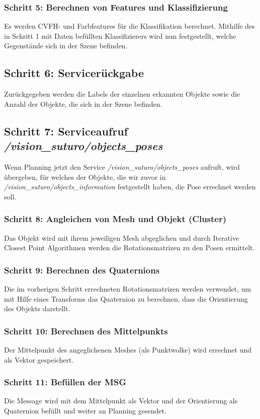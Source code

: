 \documentclass{suturo}
\begin{document}
\subsubsection{Schritt 5: Berechnen von Features und Klassifizierung}
Es werden CVFH- und Farbfeatures für die Klassifikation berechnet. Mithilfe des in Schritt 1 mit Daten befüllten Klassifizierers wird nun festgestellt, welche Gegenstände sich in der Szene befinden.
\\
\subsection{Schritt 6: Servicerückgabe}
Zurückgegeben werden die Labels der einzelnen erkannten Objekte sowie die Anzahl der Objekte, die sich in der Szene befinden.
\\
\subsection{Schritt 7: Serviceaufruf \textit{/vision\_suturo/objects\_poses}}
Wenn Planning jetzt den Service \textit{/vision\_suturo/objects\_poses} aufruft, wird übergeben, für welches der Objekte, die wir zuvor in \textit{/vision\_suturo/objects\_information} festgestellt haben, die Pose errechnet werden soll.

\subsubsection{Schritt 8: Angleichen von Mesh und Objekt (Cluster)}
Das Objekt wird mit ihrem jeweiligen Mesh abgeglichen und durch Iterative Closest Point Algorithmen werden die Rotationsmatrizen zu den Posen ermittelt.

\subsubsection{Schritt 9: Berechnen des Quaternions }
Die im vorherigen Schritt errechneten Rotationsmatrizen werden verwendet, um mit Hilfe eines Transforms das Quaternion zu berechnen, dass die Orientierung des Objekts darstellt. 

\subsubsection{Schritt 10: Berechnen des Mittelpunkts }
Der Mittelpunkt des angeglichenen Meshes (als Punktwolke) wird errechnet und als Vektor gespeichert.
\\
\subsubsection{Schritt 11: Befüllen der MSG }
Die Message wird mit dem Mittelpunkt als Vektor und der Orientierung als Quaternion befüllt und weiter an Planning gesendet.
\end{document}
